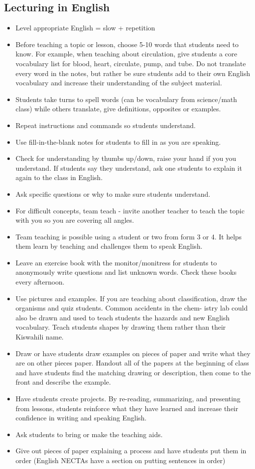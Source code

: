 \subsection{Lecturing in English}
\begin{itemize}
\item Level appropriate English = slow + repetition 
\item Before teaching a topic or lesson, choose 5-10 words that students
need to know. For example, when teaching about circulation, give students
a core vocabulary list for blood, heart, circulate, pump, and tube.
Do not translate every word in the notes, but rather be sure students
add to their own English vocabulary and increase their understanding
of the subject material. 
\item Students take turns to spell words (can be vocabulary from science/math
class) while others translate, give definitions, opposites or examples. 
\item Repeat instructions and commands so students understand.  
\item Use fill-in-the-blank notes for students to fill in as you are speaking.
 
\item Check for understanding by thumbs up/down, raise your hand if you
you understand. If students say they understand, ask one students
to explain it again to the class in English.  
\item Ask specific questions or why to make sure students understand.  
\item For difficult concepts, team teach - invite another teacher to teach
the topic with you so you are covering all angles.  
\item Team teaching is possible using a student or two from form 3 or 4.
It helps them learn by teaching and challenges them to speak English.
 
\item Leave an exercise book with the monitor/monitress for students to
anonymously write questions and list unknown words. Check these books
every afternoon. 
\item Use pictures and examples. If you are teaching about classification,
draw the organisms and quiz students. Common accidents in the chem-
istry lab could also be drawn and used to teach students the hazards
and new English vocabulary. Teach students shapes by drawing them
rather than their Kiswahili name. 
\item Draw or have students draw examples on pieces of paper and write what
they are on other pieces paper. Handout all of the papers at the beginning
of class and have students find the matching drawing or description,
then come to the front and describe the example. 
\item Have students create projects. By re-reading, summarizing, and presenting
from lessons, students reinforce what they have learned and increase
their confidence in writing and speaking English.  
\item Ask students to bring or make the teaching aids. 
\item Give out pieces of paper explaining a process and have students put
them in order (English NECTAs have a section on putting sentences
in order) 
\end{itemize}
